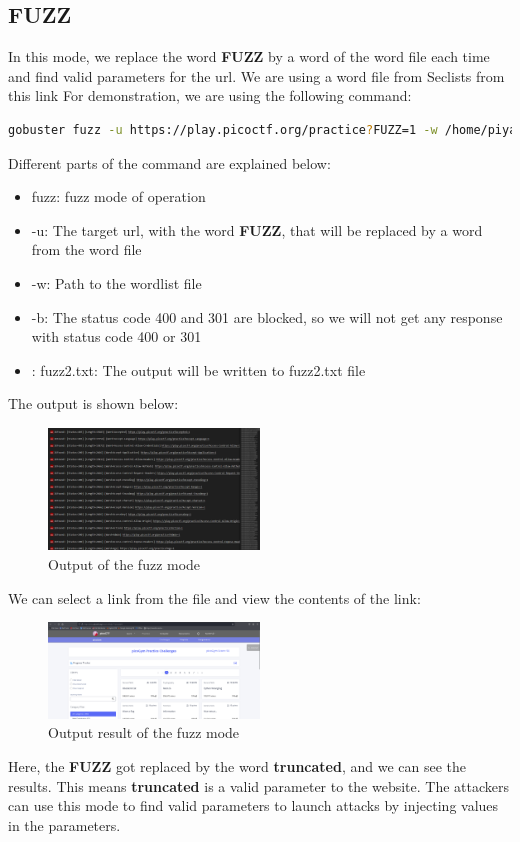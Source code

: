 \documentclass[12 pt]{article}
\begin{document}
\subsection{FUZZ}
In this mode, we replace the word \textbf{FUZZ} by a word of the word file each time and find valid parameters for the url. We are using a word file from Seclists from this link\cite{seclists} For demonstration, we are using the following command:
\begin{lstlisting}[language=bash]
gobuster fuzz -u https://play.picoctf.org/practice?FUZZ=1 -w /home/piyal/SecLists/Discovery/Web-Content/BurpSuite-ParamMiner/lowercase-headers -b 400,301 > fuzz2.txt
\end{lstlisting}
Different parts of the command are explained below:
\begin{itemize}
    \item fuzz: fuzz mode of operation
    \item -u: The target url, with the word \textbf{FUZZ}, that will be replaced by a word from the word file 
    \item -w: Path to the wordlist file
    \item -b: The status code 400 and 301 are blocked, so we will not get any response with status code 400 or 301
    \item: fuzz2.txt: The output will be written to fuzz2.txt file
\end{itemize}
The output is shown below:
\begin{figure}[!htbp]
    \centering
    \includegraphics[width=0.5\textwidth]{Fuzz_Output.png}
    \caption{Output of the fuzz mode}
    \label{fig: FUZZ Output}
\end{figure}
\newline
We can select a link from the file and view the contents of the link:\\
\begin{figure}[!htbp]
    \centering
    \includegraphics[width=0.5\textwidth]{Fuzz_Output_Link.png}
    \caption{Output result of the fuzz mode}
    \label{fig: FUZZ Output Result}
\end{figure}
\newline
Here, the \textbf{FUZZ} got replaced by the word \textbf{truncated}, and we can see the results. This means \textbf{truncated} is a valid parameter to the website. The attackers can use this mode to find valid parameters to launch attacks by injecting values in the parameters.
\end{document}
